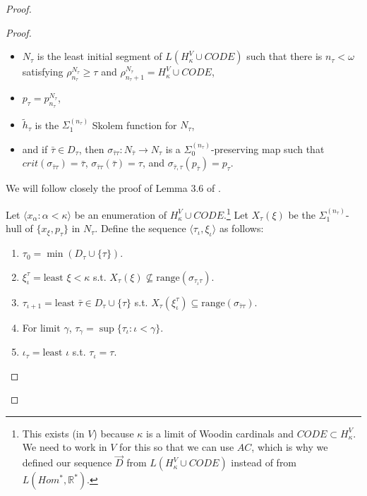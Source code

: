 \documentclass[12pt]{article}
\newcommand\R{\mathbb{R}}
\begin{document}
\begin{proof}
\begin{proof}
        \begin{itemize}
            \item $N_\tau$ is the least initial segment of $L(H_\kappa^V \cup CODE)$ such that there is $n_\tau<\omega$ satisfying $\rho^{N_\tau}_{n_\tau} \geq \tau$ and $\rho^{N_\tau}_{n_\tau+1} = H_\kappa^V \cup CODE$,
            \item $p_\tau = p^{N_\tau}_{n_\tau}$,
            \item $\tilde{h}_\tau$ is the $\Sigma_1^{(n_\tau)}$ Skolem function for $N_\tau$,
            \item and if $\bar{\tau}\in D_\tau$, then $\sigma_{\bar{\tau}\tau}: N_{\bar{\tau}}\to N_\tau$ is a $\Sigma_0^{(n_\tau)}$-preserving map such that $crit(\sigma_{\bar{\tau}\tau}) = \bar{\tau}$, $\sigma_{\bar{\tau}\tau}(\bar{\tau}) = \tau$, and $\sigma_{\bar{\tau},\tau}(p_{\bar{\tau}}) = p_\tau$.
        \end{itemize}
        
        
        
        We will follow closely the proof of Lemma 3.6 of \cite{zssquare}.

        Let $\langle x_\alpha : \alpha < \kappa\rangle$ be an enumeration of $H_\kappa^V \cup CODE$.\footnote{This exists (in $V$) because $\kappa$ is a limit of Woodin cardinals and $CODE\subset H_\kappa^V$. We need to work in $V$ for this so that we can use $AC$, which is why we defined our sequence $\vec{D}$ from $L(H^V_\kappa \cup CODE)$ instead of from $L(Hom^*,\R^*)$.} Let $X_\tau(\xi)$ be the $\Sigma^{(n_\tau)}_1$-hull of $\{x_\xi,p_\tau\}$ in $N_\tau$. Define the sequence $\langle \tau_\iota, \xi_\iota\rangle$ as follows:
        \begin{enumerate}
            \item $\tau_0 = \min(D_\tau\cup\{\tau\})$.
            \item $\xi^\tau_\iota = \text{least } \xi<\kappa$ s.t. $X_\tau(\xi)\nsubseteq \text{range}(\sigma_{\tau_\iota\tau})$.
            \item $\tau_{\iota+1} = \text{least } \bar{\tau}\in D_\tau\cup\{\tau\}$ s.t. $X_\tau(\xi^\tau_\iota)\subseteq \text{range}(\sigma_{\bar{\tau}\tau})$.
            \item For limit $\gamma$, $\tau_\gamma = \sup\{\tau_\iota:\iota < \gamma\}$.
            \item $\iota_\tau = \text{least } \iota$ s.t. $\tau_\iota = \tau$.
        \end{enumerate}


\end{proof}
\end{proof}
\end{document}
